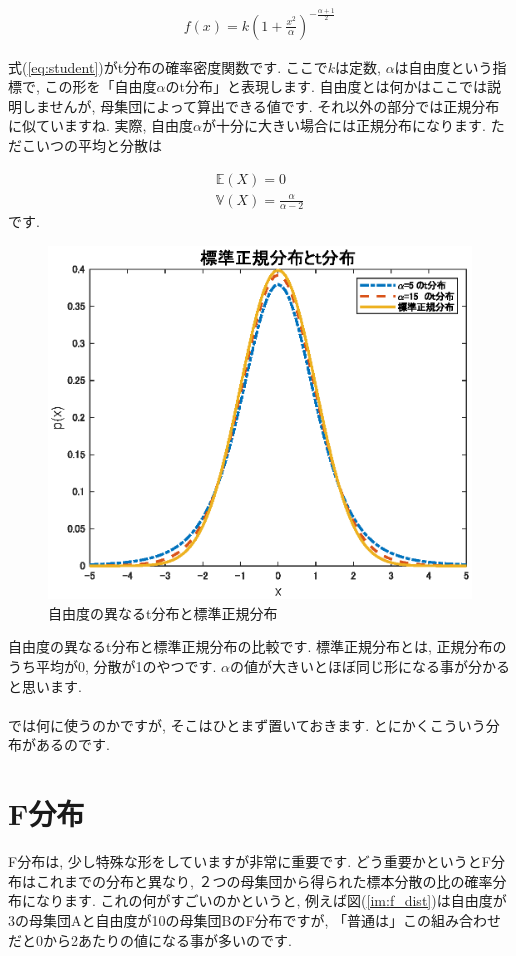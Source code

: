 \documentclass[11pt,a4paper]{ujreport} 	%
\begin{document}
\begin{align}
\label{eq:student}
f(x) = k(1 + \frac{x^2}{\alpha})^{-\frac{\alpha+1}{2}}
\end{align}

式(\ref{eq:student})がt分布の確率密度関数です. ここで$k$は定数, $\alpha$は自由度という指標で, この形を「自由度$\alpha$のt分布」と表現します. 自由度とは何かはここでは説明しませんが, 母集団によって算出できる値です. それ以外の部分では正規分布に似ていますね. 実際, 自由度$\alpha$が十分に大きい場合には正規分布になります. ただこいつの平均と分散は

\begin{align}
\mathbb{E}(X) = 0\\
\mathbb{V}(X) = \frac{\alpha}{\alpha-2}
\end{align}
です. 

\begin{figure}[H]
\label{im:student}
  \centering
  \includegraphics[width=120mm]{../figures/student.eps}
  \caption{自由度の異なるt分布と標準正規分布}
\end{figure}

自由度の異なるt分布と標準正規分布の比較です. 標準正規分布とは, 正規分布のうち平均が0, 分散が1のやつです. $\alpha$の値が大きいとほぼ同じ形になる事が分かると思います.\\
\\

では何に使うのかですが, そこはひとまず置いておきます. とにかくこういう分布があるのです.


\section{F分布}
F分布は, 少し特殊な形をしていますが非常に重要です. どう重要かというとF分布はこれまでの分布と異なり, ２つの母集団から得られた標本分散の比の確率分布になります. これの何がすごいのかというと, 例えば図(\ref{im:f_dist})は自由度が3の母集団Aと自由度が10の母集団BのF分布ですが, 「普通は」この組み合わせだと0から2あたりの値になる事が多いのです. \\
\\
\end{document}
